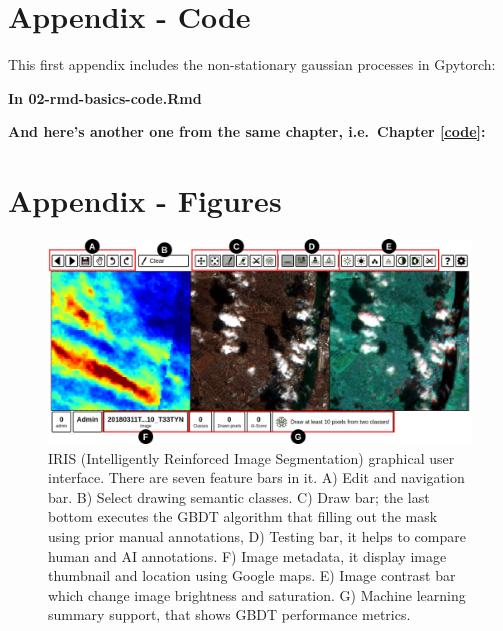 \documentclass[a4paper, nobind]{templates/cdethesis}
\begin{document}
\startappendices

\hypertarget{appendix---code}{%
\chapter{Appendix - Code}\label{appendix---code}}

This first appendix includes the non-stationary gaussian processes in Gpytorch:

\textbf{In 02-rmd-basics-code.Rmd}

\textbf{And here's another one from the same chapter, i.e.~Chapter \ref{code}:}

\hypertarget{appendix---figures}{%
\chapter{Appendix - Figures}\label{appendix---figures}}

\setcounter{figure}{0}
\makeatletter 
\renewcommand{\thefigure}{S\@arabic\c@figure}
\makeatother

\begin{figure}[!h]
    \centering
    \includegraphics[width=1\linewidth]{figures/extra/figureS2.png}
    \caption{IRIS (Intelligently Reinforced Image Segmentation) graphical user interface. There are seven feature bars in it. A) Edit and navigation bar. B) Select drawing semantic classes. C) Draw bar; the last bottom executes the GBDT algorithm that filling out the mask using prior manual annotations, D) Testing bar, it helps to compare human and AI annotations. F) Image metadata, it display image thumbnail and location using Google maps. E) Image contrast bar which change image brightness and saturation. G) Machine learning summary support, that shows GBDT performance metrics.}
    \label{fig:figureS01}
\end{figure}
\end{document}
